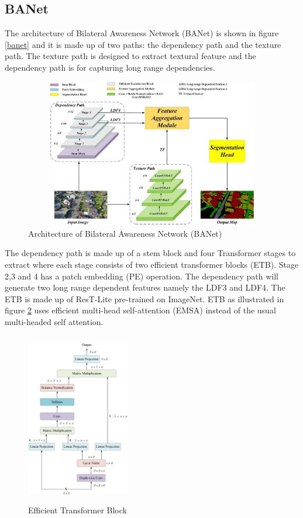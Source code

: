 \subsection{BANet}
The architecture of Bilateral Awareness Network (BANet) is shown in figure \ref{banet} and it is made up of two paths: the dependency path and the texture path. The texture path is designed to extract textural feature and the dependency path is for capturing long range dependencies.

\FloatBarrier
\begin{figure}[ht]
\includegraphics[width=12.5cm, height=6.5cm]{images/banet.jpg}
\centering
\caption{Architecture of Bilateral Awareness Network (BANet) \protect\cite{banet}}
\label{fig:banet}
\end{figure}

The dependency path is made up of a stem block and four Transformer stages to extract where each stage consists of two efficient transformer blocks (ETB). Stage 2,3 and 4 has a patch embedding (PE) operation. The dependency path will generate two long range dependent features namely the LDF3 and LDF4. The ETB is made up of ResT-Lite \cite{restlite} pre-trained on ImageNet. ETB as illustrated in figure \ref{fig:etb} uses efficient multi-head self-attention (EMSA) instead of the usual multi-headed self attention.

\FloatBarrier
\begin{figure}[ht]
\includegraphics[width=4.5cm, height=7.5cm]{images/etb.png}
\centering
\caption{Efficient Transformer Block \protect\cite{banet}}
\label{fig:etb}
\end{figure}

